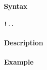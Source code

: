 


	\paragraph{Syntax}\label{syntax}

\begin{verbatim}
!..
\end{verbatim}

\paragraph{Description}\label{description}

\paragraph{Example}\label{example}


